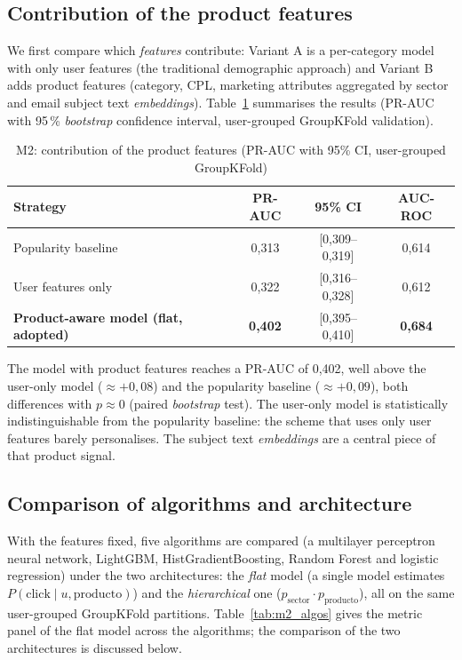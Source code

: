 \subsection{Contribution of the product features}
\label{sec:m2-variables}

We first compare which \emph{features} contribute: Variant A is a per-category model with only user features (the traditional demographic approach) and Variant B adds product features (category, CPL, marketing attributes aggregated by sector and email subject text \textit{embeddings}). Table~\ref{tab:m2_models} summarises the results (PR-AUC with 95\,\% \textit{bootstrap} confidence interval, user-grouped GroupKFold validation).

\begin{table}[htbp]
\centering
\caption{M2: contribution of the product features (PR-AUC with 95\% CI, user-grouped GroupKFold)}
\label{tab:m2_models}
\begin{tabular}{lccc}
\toprule
\textbf{Strategy} & \textbf{PR-AUC} & \textbf{95\% CI} & \textbf{AUC-ROC} \\
\midrule
Popularity baseline                             & 0,313 & [0,309--0,319] & 0,614 \\
User features only                              & 0,322 & [0,316--0,328] & 0,612 \\
\textbf{Product-aware model (flat, adopted)}    & \textbf{0,402} & [0,395--0,410] & \textbf{0,684} \\
\bottomrule
\end{tabular}
\end{table}

The model with product features reaches a PR-AUC of 0,402, well above the user-only model ($\approx+0{,}08$) and the popularity baseline ($\approx+0{,}09$), both differences with $p\approx0$ (paired \textit{bootstrap} test). The user-only model is statistically indistinguishable from the popularity baseline: the scheme that uses only user features barely personalises. The subject text \textit{embeddings} are a central piece of that product signal.

\subsection{Comparison of algorithms and architecture}
\label{sec:m2-algos}

With the features fixed, five algorithms are compared (a multilayer perceptron neural network, LightGBM, HistGradientBoosting, Random Forest and logistic regression) under the two architectures: the \emph{flat} model (a single model estimates $P(\text{click}\mid u,\text{producto})$) and the \emph{hierarchical} one ($p_\text{sector}\cdot p_\text{producto}$), all on the same user-grouped GroupKFold partitions. Table~\ref{tab:m2_algos} gives the metric panel of the flat model across the algorithms; the comparison of the two architectures is discussed below.

